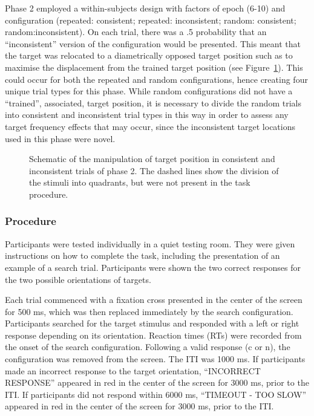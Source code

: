 \documentclass[
  man,
  floatsintext,
  longtable,
  nolmodern,
  notxfonts,
  notimes,
  colorlinks=true,linkcolor=blue,citecolor=blue,urlcolor=blue]{apa7}
\begin{document}
Phase 2 employed a within-subjects design with factors of epoch (6-10)
and configuration (repeated: consistent; repeated: inconsistent; random:
consistent; random:inconsistent). On each trial, there was a .5
probability that an ``inconsistent'' version of the configuration would
be presented. This meant that the target was relocated to a
diametrically opposed target position such as to maximise the
displacement from the trained target position (see
Figure~\ref{fig-schematic}). This could occur for both the repeated and
random configurations, hence creating four unique trial types for this
phase. While random configurations did not have a ``trained'',
associated, target position, it is necessary to divide the random trials
into consistent and inconsistent trial types in this way in order to
assess any target frequency effects that may occur, since the
inconsistent target locations used in this phase were novel.

\begin{figure}[H]


\caption{\label{fig-schematic}Schematic of the manipulation of target
position in consistent and inconsistent trials of phase 2. The dashed
lines show the division of the stimuli into quadrants, but were not
present in the task procedure.}

\end{figure}%

\subsubsection{Procedure}\label{procedure}

Participants were tested individually in a quiet testing room. They were
given instructions on how to complete the task, including the
presentation of an example of a search trial. Participants were shown
the two correct responses for the two possible orientations of targets.

Each trial commenced with a fixation cross presented in the center of
the screen for 500 ms, which was then replaced immediately by the search
configuration. Participants searched for the target stimulus and
responded with a left or right response depending on its orientation.
Reaction times (RTs) were recorded from the onset of the search
configuration. Following a valid response (c or n), the configuration
was removed from the screen. The ITI was 1000 ms. If participants made
an incorrect response to the target orientation, ``INCORRECT RESPONSE''
appeared in red in the center of the screen for 3000 ms, prior to the
ITI. If participants did not respond within 6000 ms, ``TIMEOUT - TOO
SLOW'' appeared in red in the center of the screen for 3000 ms, prior to
the ITI.
\end{document}
